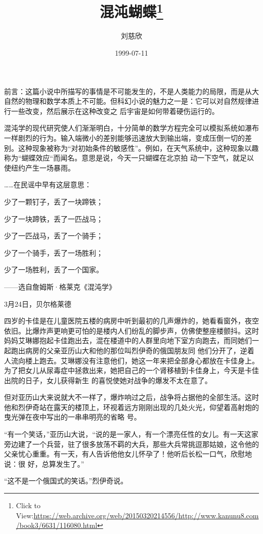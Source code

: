\documentclass{article}
\title{混沌蝴蝶\footnote{Click to View:\url{https://web.archive.org/web/20150320214556/http://www.kanunu8.com/book3/6631/116080.html}}}
\author{刘慈欣}
\date{1999-07-11}
\begin{document}

\maketitle


\Large

﻿前言：这篇小说中所描写的事情是不可能发生的，不是人类能力的局限，而是从大自然的物理和数学本质上不可能。但科幻小说的魅力之一是：它可以对自然规律进行一些改变，然后展示在这种改变之
后宇宙是如何带着硬伤运行的。 

混沌学的现代研究使人们渐渐明白，十分简单的数学方程完全可以模拟系统如瀑布一样剧烈的行为。输入端微小的差别能够迅速放大到输出端，变成压倒一切的差别。这种现象被称为“对初始条件的敏感性”。例如，在天气系统中，这种现象以趣称为“蝴蝶效应“而闻名。意思是说，今天一只蝴蝶在北京拍
动一下空气，就足以使纽约产生一场暴雨。 


\newpage

……在民谣中早有这层意思： 


少了一颗钉子，丢了一块蹄铁； 


少了一块蹄铁，丢了一匹战马； 


少了一匹战马，丢了一个骑手； 


少了一个骑手，丢了一场胜利； 


少了一场胜利，丢了一个国家。 


——选自詹姆斯·格莱克《混沌学》 


3月24日，贝尔格莱德 

四岁的卡佳是在儿童医院五楼的病房中听到最初的几声爆炸的，她看看窗外，夜空依旧。比爆炸声更响更可怕的是楼内人们纷乱的脚步声，仿佛使整座楼颤抖。这时妈妈艾琳娜抱起卡佳跑出去，混在楼道中的人群里向地下室方向跑去，而同她们一起跑出病房的父亲亚历山大和他的那位叫烈伊奇的俄国朋友同
\newpage
他们分开了，逆着人流向楼上跑去。艾琳娜没有注意他们，她这一年来把全部身心都放在卡佳身上。为了把女儿从尿毒症中拯救出来，她把自己的一个肾移植到卡佳身上，今天是卡佳出院的日子，女儿获得新生
的喜悦使她对战争的爆发不太在意了。 

但对亚历山大来说就大不一样了，爆炸响过之后，战争将占据他的全部生活。这时他和烈伊奇站在露天的楼顶上，环视着远方刚刚出现的几处火光，仰望着高射炮的曳光弹在夜中写出的一串串明亮的省略
号。 

“有一个笑话，”亚历山大说，“说的是一家人，有一个漂亮任性的女儿。有一天这家旁边建了一个兵营，驻了很多放荡不羁的大兵，那些大兵常挑逗那姑娘，这令他的父亲忧心重重。有一天，有人告诉他他女儿怀孕了！他听后长松一口气，欣慰地说：很
好，总算发生了。” 


“这不是一个俄国式的笑话。”烈伊奇说。 
\end{document}
